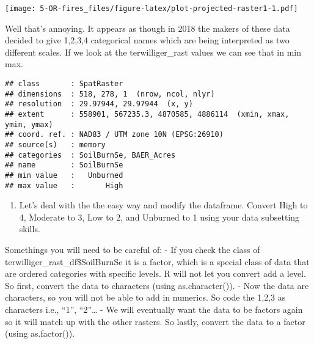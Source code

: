 \documentclass[
]{article}
\newenvironment{Shaded}{\begin{snugshade}}{\end{snugshade}}
\newcommand{\NormalTok}[1]{#1}
\newcommand{\SpecialCharTok}[1]{\textcolor[rgb]{0.81,0.36,0.00}{\textbf{#1}}}
\providecommand{\tightlist}{%
  \setlength{\itemsep}{0pt}\setlength{\parskip}{0pt}}
\begin{document}
\texttt{[image: 5-OR-fires\_files/figure-latex/plot-projected-raster1-1.pdf]}

Well that's annoying. It appears as though in 2018 the makers of these
data decided to give 1,2,3,4 categorical names which are being
interpreted as two different scales. If we look at the terwilliger\_rast
values we can see that in min max.

\begin{Shaded}
\end{Shaded}

\begin{verbatim}
## class       : SpatRaster 
## dimensions  : 518, 278, 1  (nrow, ncol, nlyr)
## resolution  : 29.97944, 29.97944  (x, y)
## extent      : 558901, 567235.3, 4870585, 4886114  (xmin, xmax, ymin, ymax)
## coord. ref. : NAD83 / UTM zone 10N (EPSG:26910) 
## source(s)   : memory
## categories  : SoilBurnSe, BAER_Acres 
## name        : SoilBurnSe 
## min value   :   Unburned 
## max value   :       High
\end{verbatim}

\begin{enumerate}
\def\labelenumi{\alph{enumi}.}
\setcounter{enumi}{3}
\tightlist
\item
  Let's deal with the the easy way and modify the dataframe. Convert
  High to 4, Moderate to 3, Low to 2, and Unburned to 1 using your data
  subsetting skills.
\end{enumerate}

Somethings you will need to be careful of: - If you check the class of
terwilliger\_rast\_df\$SoilBurnSe it is a factor, which is a special
class of data that are ordered categories with specific levels. R will
not let you convert add a level. So first, convert the data to
characters (using as.character()). - Now the data are characters, so you
will not be able to add in numerics. So code the 1,2,3 as characters
i.e., ``1'', ``2''\ldots{} - We will eventually want the data to be
factors again so it will match up with the other rasters. So lastly,
convert the data to a factor (using as.factor()).
\end{document}
